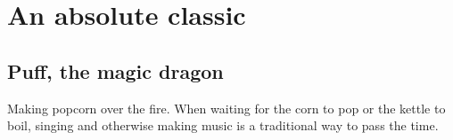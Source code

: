 \section{An absolute classic}
\subsection{Puff, the magic dragon}

\begin{marginfigure}
      \checkoddpage \ifoddpage \forcerectofloat \else \forceversofloat \fi
      \centering
  \caption{Making popcorn over the fire. When waiting for the corn to pop or the kettle to boil, singing and otherwise making music is a traditional way to pass the time. }
\end{marginfigure}

